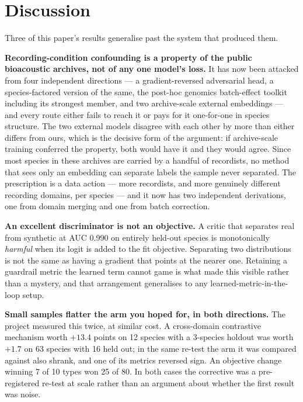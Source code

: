 \documentclass[10pt,twocolumn,a4paper]{article}
\begin{document}
\section{Discussion}
\label{sec:discussion}

Three of this paper's results generalise past the system that produced them.

\textbf{Recording-condition confounding is a property of the public bioacoustic archives, not
of any one model's loss.} It has now been attacked from four independent directions --- a
gradient-reversed adversarial head, a species-factored version of the same, the post-hoc
genomics batch-effect toolkit including its strongest member, and two archive-scale external
embeddings --- and every route either fails to reach it or pays for it one-for-one in species
structure. The two external models disagree with each other by more than either differs from
ours, which is the decisive form of the argument: if archive-scale training conferred the
property, both would have it and they would agree. Since most species in these archives are
carried by a handful of recordists, no method that sees only an embedding can separate labels
the sample never separated. The prescription is a data action --- more recordists, and more
genuinely different recording domains, per species --- and it now has two independent
derivations, one from domain merging and one from batch correction.

\textbf{An excellent discriminator is not an objective.} A critic that separates real from
synthetic at AUC 0.990 on entirely held-out species is monotonically \emph{harmful} when its
logit is added to the fit objective. Separating two distributions is not the same as having a
gradient that points at the nearer one. Retaining a guardrail metric the learned term cannot
game is what made this visible rather than a mystery, and that arrangement generalises to any
learned-metric-in-the-loop setup.

\textbf{Small samples flatter the arm you hoped for, in both directions.} The project measured
this twice, at similar cost. A cross-domain contrastive mechanism worth $+13.4$ points on 12
species with a 3-species holdout was worth $+1.7$ on 63 species with 16 held out; in the same
re-test the arm it was compared against also shrank, and one of its metrics reversed sign. An
objective change winning 7 of 10 types won 25 of 80. In both cases the corrective was a
pre-registered re-test at scale rather than an argument about whether the first result was
noise.
\end{document}
